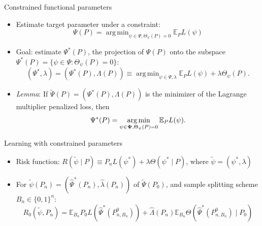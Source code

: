 \documentclass[12pt,t,handout]{beamer}
\newcommand{\E}{\mathbb{E}}
\DeclareMathOperator*{\argmin}{arg\,min}
\begin{document}

\begin{frame}[c]{Constrained functional parameters}

\begin{center}
\begin{itemize}
  \itemsep12pt
  \item Estimate target parameter under a constraint:
    $$\Psi(P) = \argmin_{\psi \in \Psi, \Theta_{\psi}(P) = 0} \E_PL(\psi)$$
  \item Goal: estimate $\Psi^*(P)$, the projection of $\Psi(P)$ onto the
    subspace $\Psi^*(P) = \{\psi \in \Psi: \Theta_{\psi}(P) = 0\}$:
    $$(\Psi^*, \lambda) = (\Psi^*(P), \Lambda(P)) \equiv \argmin_{\psi \in \Psi,
      \lambda} \E_PL(\psi) + \lambda \Theta_{\psi}(P).$$
  \item \textit{Lemma}: If $\widetilde{\Psi}(P) = (\Psi^*(P), \Lambda(P))$ is
    the minimizer of the Lagrange multiplier penalized loss, then
    $$\Psi^*(P) = \argmin_{\psi \in {\bf \Psi}, \Theta_{\psi}(P) = 0}
      \E_{P}L(\psi).$$
\end{itemize}
\end{center}

\note{
}

\end{frame}


\begin{frame}[c]{Learning with constrained parameters}

\begin{center}
\begin{itemize}
  \itemsep14pt
  \item Risk function: $R(\widetilde{\psi} \mid P) \equiv P_nL(\psi^*) +
    \lambda \Theta(\psi^* \mid P)$, where $\widetilde{\psi} = (\psi^*,
    \lambda)$
  \item For $\widetilde{\psi}(P_n) = (\hat{\Psi}^*(P_n), \hat{\lambda}(P_n))$ of
    $\widetilde{\Psi}(P_0)$, and sample splitting scheme $B_n \in \{0, 1\}^n$:
    $$R_0(\widetilde{\psi}, P_n) = \E_{B_n} P_0L(\hat{\Psi}^*(P_{n, B_n}^0)) +
      \hat{\Lambda}(P_n) \E_{B_n} \Theta(\hat{\Psi}^*(P_{n, B_n}^0) \mid P_0)$$
\end{itemize}
\end{center}


\end{frame}
\end{document}
